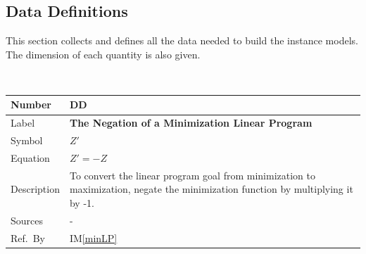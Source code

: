 \documentclass[12pt]{article}
\newcommand{\colAwidth}{0.13\textwidth}
\newcommand{\colBwidth}{0.82\textwidth}
\newcounter{defnum} %
\newcounter{datadefnum} %
\newcommand{\iref}[1]{IM\ref{#1}}
\begin{document}
\subsection{Data Definitions} \label{sec_datadef}

This section collects and defines all the data needed to build the instance
models. The dimension of each quantity is also given.  
	
~\newline

\noindent
\begin{minipage}{\textwidth}
	\renewcommand*{\arraystretch}{1.5}
	\begin{tabular}{| p{\colAwidth} | p{\colBwidth}|}
		\hline
		\rowcolor[gray]{0.9}
		Number& DD{datadefnum}\thedatadefnum 
		\label{minToMax}\\
		\hline
		Label& \bf The Negation of a Minimization Linear Program\\
		\hline
		Symbol & $Z'$\\
		\hline
		Equation& $Z' = -Z$\\
		\hline
		Description & 
		To convert the linear program goal from minimization to maximization, 
		negate the minimization function by multiplying it by -1.
		\\
		\hline
		Sources& -\\
		\hline
		Ref.\ By & \iref{minLP}\\
		\hline
	\end{tabular}
\end{minipage}\\

~\newline
\end{document}
